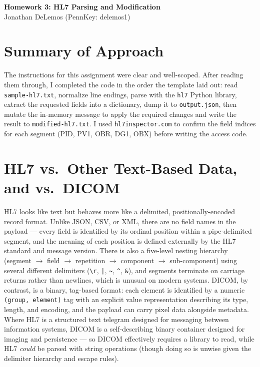 \documentclass[10pt]{article}
\begin{document}
\begin{center}
{\large\bfseries Homework 3: HL7 Parsing and Modification}\\
Jonathan DeLemos \quad (PennKey: delemos1)
\end{center}
\vspace{-0.5em}

\section*{Summary of Approach}
The instructions for this assignment were clear and well-scoped. After reading them through, I completed the code in the order the template laid out: read \texttt{sample-hl7.txt}, normalize line endings, parse with the \texttt{hl7} Python library, extract the requested fields into a dictionary, dump it to \texttt{output.json}, then mutate the in-memory message to apply the required changes and write the result to \texttt{modified-hl7.txt}. I used \texttt{hl7inspector.com} to confirm the field indices for each segment (PID, PV1, OBR, DG1, OBX) before writing the access code.

\section*{HL7 vs.\ Other Text-Based Data, and vs.\ DICOM}
HL7 looks like text but behaves more like a delimited, positionally-encoded record format. Unlike JSON, CSV, or XML, there are no field names in the payload --- every field is identified by its ordinal position within a pipe-delimited segment, and the meaning of each position is defined externally by the HL7 standard and message version. There is also a five-level nesting hierarchy (segment $\rightarrow$ field $\rightarrow$ repetition $\rightarrow$ component $\rightarrow$ sub-component) using several different delimiters (\verb|\r|, \verb!|!, \verb|~|, \verb|^|, \verb|&|), and segments terminate on carriage returns rather than newlines, which is unusual on modern systems. DICOM, by contrast, is a binary, tag-based format: each element is identified by a numeric \texttt{(group, element)} tag with an explicit value representation describing its type, length, and encoding, and the payload can carry pixel data alongside metadata. Where HL7 is a structured text telegram designed for messaging between information systems, DICOM is a self-describing binary container designed for imaging and persistence --- so DICOM effectively requires a library to read, while HL7 \emph{could} be parsed with string operations (though doing so is unwise given the delimiter hierarchy and escape rules).
\end{document}
